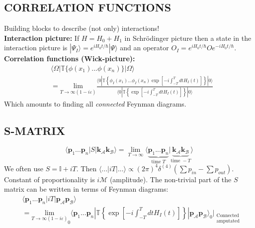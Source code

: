 \documentclass[a4paper, norsk, 8pt, landscape]{article}
\newcommand{\EQU}[1] { \begin{equation*} \begin{split}
#1
\end{split} \end{equation*} }
\newcommand{\ket}[1] { |#1\rangle }
\newcommand{\bra}[1] { \langle #1 | }
\newcommand{\braket}[2] { \langle #1 | #2 \rangle }
\begin{document}
\begin{multicols*}{3}
\subsection*{\small  CORRELATION FUNCTIONS}
Building blocks to describe (not only) interactions! \\
 {\textbf{Interaction picture:}}
If $H=H_0+H_1$ in Schr\"odinger picture then a state in the interaction picture is
$\ket{\Psi_I}=e^{iH_0t/\hbar}\ket{\Psi}$ and an operator $O_I=e^{iH_0t/\hbar}Oe^{-iH_0t/\hbar}$.
\\
 {\textbf{Correlation functions (Wick-picture):}} \\
\EQU{
&\bra{\Omega}\mathbb{T}\{\phi(x_1)...\phi(x_n)\}\ket{\Omega} \\
&=
\underset{T\rightarrow \infty(1-i\varepsilon)}{\text{lim}}
\frac{
\bra{0}\mathbb{T}\left\{\phi_I(x_1)...\phi_I(x_n)\exp \left[-i\int_{-T}^Tdt H_I(t) \right] \right\}\ket{0}
}{
\bra{0}\mathbb{T}\left\{\exp \left[-i\int_{-T}^Tdt H_I(t) \right] \right\}\ket{0}
}
}
Which amounts to finding all {\it connected} Feynman diagrams.


















\subsection*{\small  S-MATRIX}
\[
\bra{\mathbf{p}_1...\mathbf{p}_n}S \ket{\mathbf{k}_\mathcal{A}\mathbf{k}_\mathcal{B}}
=
\lim_{T\rightarrow \infty}
\braket{\underbrace{\mathbf{p}_1...\mathbf{p}_n}_{\text{time } T}}{\underbrace{\mathbf{k}_\mathcal{A}\mathbf{k}_\mathcal{B}}_{\text{time } -T}}
\]
We often use $S=\mathbb{I}+iT$. Then $\bra{...}iT\ket{...}\propto (2\pi)^4 \delta^{(4)}(\sum p_{in}-\sum p_{out})$.
Constant of proportionality is $i\mathcal{M}$ (amplitude).
The non-trivial part of the $S$ matrix can be written in terms of Feynman diagrams: \\

\EQU{
&\bra{\mathbf{p}_1...\mathbf{p}_n}iT\ket{\mathbf{p}_\mathcal{A}\mathbf{p}_\mathcal{B}} \\
&=
\underset{T\rightarrow \infty(1-i\varepsilon)}{\text{lim}}
_0\bra{\mathbf{p}_1...\mathbf{p}_n}
\mathbb{T}\left\{\exp \left[-i\int_{-T}^Tdt H_I(t) \right] \right\}
\ket{\mathbf{p}_\mathcal{A}\mathbf{p}_\mathcal{B}}_0
\bigg|_{\substack{\text{Connected} \\ \text{amputated}} }
}



















\end{multicols*}
\end{document}
